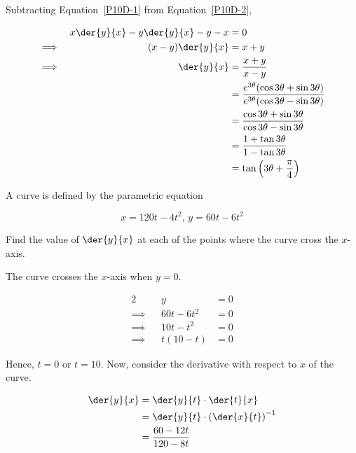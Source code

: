 \documentclass{jhwhw}
\begin{document}
            Subtracting Equation~\ref{P10D-1} from Equation~\ref{P10D-2}, 

            \begin{alignat*}{2}
                &&x\der{y}{x} - y \der{y}{x} - y - x &= 0\\
                \implies&&(x-y)\der{y}{x} &= x+y\\
                \implies&&\der{y}{x} &= \dfrac{x+y}{x-y}\\
                && &= \dfrac{e^{3\theta}(\cos 3\theta + \sin 3\theta)}{e^{3\theta}(\cos 3\theta - \sin 3\theta)}\\
                && &= \dfrac{\cos 3\theta + \sin 3\theta}{\cos 3\theta - \sin 3\theta}\\
                && &= \dfrac{1 + \tan 3\theta}{1 - \tan 3\theta}\\
                && &= \tan\left(3\theta + \dfrac{\pi}4\right)
            \end{alignat*}


    \problem{}
        A curve is defined by the parametric equation

        \begin{equation*}
            x = 120t - 4t^2, \, y = 60t - 6t^2
        \end{equation*}

        Find the value of $\der{y}{x}$ at each of the points where the curve cross the $x$-axis.

    \solution
        The curve crosses the $x$-axis when $y=0$.

        \begin{alignat*}{2}
            &&y &= 0\\
            \implies&&60t-6t^2 &= 0\\
            \implies&&10t-t^2 &= 0\\
            \implies&&t(10 - t) &= 0
        \end{alignat*}

        Hence, $t = 0$ or $t = 10$. Now, consider the derivative with respect to $x$ of the curve.

        \begin{align*}
            \der{y}{x} &= \der{y}{t} \cdot \der{t}{x}\\
            &= \der{y}{t} \cdot \left(\der{x}{t}\right)^{-1}\\
            &= \dfrac{60 - 12t}{120 - 8t}
        \end{align*}
\end{document}
